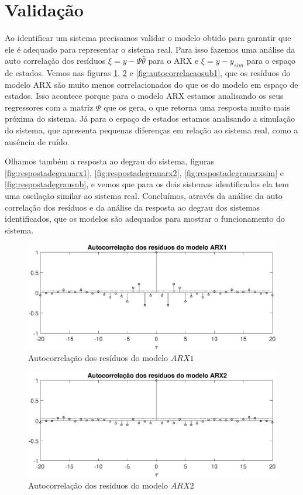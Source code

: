 \section{Validação}\label{s4:val}
Ao identificar um sistema precisamos validar o modelo obtido para garantir que ele é adequado para representar o sistema real. Para isso fazemos uma análise da auto correlação dos resíduos $\xi=y-\Psi \hat{\theta}$ para o ARX e $\xi=y-y_{sim}$ para o espaço de estados. Vemos nas figuras \ref{fig:autocorrelacaoARX1}, \ref{fig:autocorrelacaoARX2} e \ref{fig:autocorrelacaosub1}, que os resíduos do modelo ARX são muito menos correlacionados do que os do modelo em espaço de estados. Isso acontece porque para o modelo ARX estamos analisando os seus regressores com a matriz $\Psi$ que os gera, o que retorna uma resposta muito mais próxima do sistema. Já para o espaço de estados estamos analisando a simulação do sistema, que apresenta pequenas diferenças em relação ao sistema real, como a ausência de ruído.


Olhamos também a resposta ao degrau do sistema, figuras \ref{fig:respostadegrauarx1}, \ref{fig:respostadegrauarx2}, \ref{fig:respostadegrauarxsim} e  \ref{fig:respostadegrausub}, e vemos que para os dois sistemas identificados ela tem uma oscilação similar ao sistema real. Concluímos, através da análise da auto correlação dos resíduos e da análise da resposta ao degrau dos sistemas identificados, que os modelos são adequados para mostrar o funcionamento do sistema.

\begin{figure}[H]
	\centering
	\includegraphics[width=1\linewidth]{autocorrelacaoARX1}
	\caption[Autocorrelação dos resíduos do modelo $ARX1$]{Autocorrelação dos resíduos do modelo $ARX1$}
	\label{fig:autocorrelacaoARX1}
\end{figure}

\begin{figure}[H]
	\centering
	\includegraphics[width=1\linewidth]{autocorrelacaoARX2}
	\caption[Autocorrelação dos resíduos do modelo $ARX2$]{Autocorrelação dos resíduos do modelo $ARX2$}
	\label{fig:autocorrelacaoARX2}
\end{figure}

